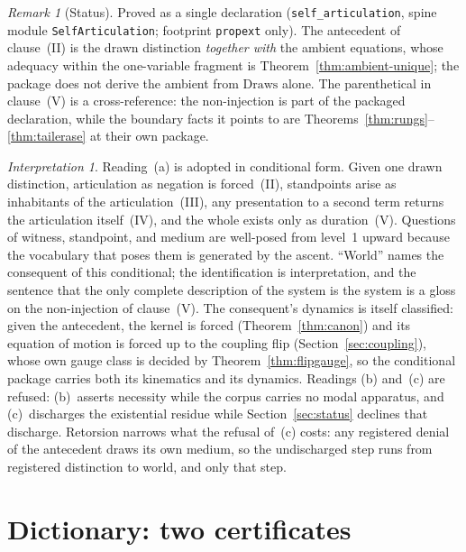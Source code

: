 \documentclass[11pt,a4paper]{article}
\theoremstyle{plain}
\theoremstyle{definition}
\theoremstyle{remark}
\newtheorem{remark}[theorem]{Remark}
\newtheorem{interpretation}[theorem]{Interpretation}
\begin{document}
\begin{remark}[Status]
Proved as a single declaration (\texttt{self\_articulation}, spine
module \texttt{SelfArticulation}; footprint \texttt{propext} only). The antecedent of clause~\textup{(II)} is the
drawn distinction \emph{together with} the ambient equations, whose
adequacy within the one-variable fragment is
Theorem~\ref{thm:ambient-unique}; the package does not derive the
ambient from $\mathrm{Draws}$ alone. The parenthetical in
clause~\textup{(V)} is a cross-reference: the non-injection is part of
the packaged declaration, while the boundary facts it points to are
Theorems~\ref{thm:rungs}--\ref{thm:tailerase} at their own package.
\end{remark}

\begin{interpretation}
\label{int:selfart}
Reading~(a) is adopted in conditional form. Given one drawn
distinction, articulation as negation is forced~\textup{(II)},
standpoints arise as inhabitants of the articulation~\textup{(III)},
any presentation to a second term returns the articulation
itself~\textup{(IV)}, and the whole exists only as
duration~\textup{(V)}. Questions of witness, standpoint, and medium are
well-posed from level~1 upward because the vocabulary that poses them
is generated by the ascent. ``World'' names the consequent of this
conditional; the identification is interpretation, and the sentence
that the only complete description of the system is the system is a
gloss on the non-injection of clause~\textup{(V)}. The consequent's
dynamics is itself classified: given the antecedent, the kernel is
forced (Theorem~\ref{thm:canon}) and its equation of motion is forced
up to the coupling flip (Section~\ref{sec:coupling}), whose own gauge
class is decided by Theorem~\ref{thm:flipgauge}, so the conditional
package carries both its kinematics and its dynamics. Readings (b)
and~(c) are refused: (b)~asserts necessity while the corpus carries no
modal apparatus, and (c)~discharges the existential residue while
Section~\ref{sec:status} declines that discharge. Retorsion narrows
what the refusal of~(c) costs: any registered denial of the antecedent
draws its own medium, so the undischarged step runs from registered
distinction to world, and only that step.
\end{interpretation}


\section{Dictionary: two certificates}
\label{sec:dict}
\end{document}
